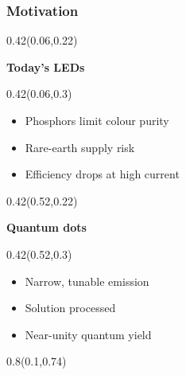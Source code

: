 \documentclass[aspectratio=169]{beamer}
\begin{document}
\begin{frame}[t]
  \frametitle{Motivation}

\begin{textblock}{0.42}(0.06,0.22)
{\raggedright\fontsize{18}{22}\selectfont \textcolor[HTML]{003E74}{\textbf{Today's LEDs}}\par}
\end{textblock}

\begin{textblock}{0.42}(0.06,0.3)
{\raggedright\fontsize{15}{18}\selectfont \begin{itemize}
\item Phosphors limit colour purity
\item Rare-earth supply risk
\item Efficiency drops at high current
\end{itemize}\par}
\end{textblock}

\begin{textblock}{0.42}(0.52,0.22)
{\raggedright\fontsize{18}{22}\selectfont \textcolor[HTML]{003E74}{\textbf{Quantum dots}}\par}
\end{textblock}

\begin{textblock}{0.42}(0.52,0.3)
{\raggedright\fontsize{15}{18}\selectfont \begin{itemize}
\item Narrow, tunable emission
\item Solution processed
\item Near-unity quantum yield
\end{itemize}\par}
\end{textblock}

\begin{textblock}{0.8}(0.1,0.74)
\end{textblock}
\end{frame}
\end{document}
